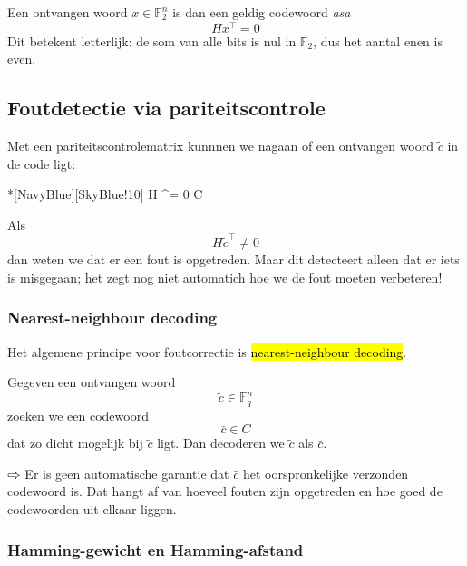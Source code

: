 Een ontvangen woord $x \in \mathbb{F}_2^n$ is dan een geldig codewoord \emph{asa}
\begin{equation*}
    Hx^\top = 0
\end{equation*}
Dit betekent letterlijk: de som van alle bits is nul in $\mathbb{F}_2$, dus het aantal enen is even.

\newpage
\subsection{Foutdetectie via pariteitscontrole}

Met een pariteitscontrolematrix kunnnen we nagaan of een ontvangen woord $\tilde{c}$ in de code ligt:

\begin{equationbox}*[NavyBlue][SkyBlue!10]
    H ^\top = 0 \iff {} \in C
\end{equationbox}
Als
\begin{equation*}
    H \tilde{c}^\top \neq 0
\end{equation*}
dan weten we dat er een fout is opgetreden. Maar dit detecteert alleen dat er iets is misgegaan; het zegt nog niet automatich hoe we de fout moeten verbeteren!

\subsubsection{Nearest-neighbour decoding}

Het algemene principe voor foutcorrectie is \hl{nearest-neighbour decoding}.

Gegeven een ontvangen woord
\begin{equation*}
    \tilde{c} \in \mathbb{F}_q^n
\end{equation*}
zoeken we een codewoord
\begin{equation*}
    \bar{c} \in C
\end{equation*}
dat zo dicht mogelijk bij $\tilde{c}$ ligt. Dan decoderen we $\tilde{c}$ als $\bar{c}$.

$\rightwhitearrow$ Er is geen automatische garantie dat $\bar{c}$ het oorspronkelijke verzonden codewoord is. Dat hangt af van hoeveel fouten zijn opgetreden en hoe goed de codewoorden uit elkaar liggen.

\subsubsection{Hamming-gewicht en Hamming-afstand}

